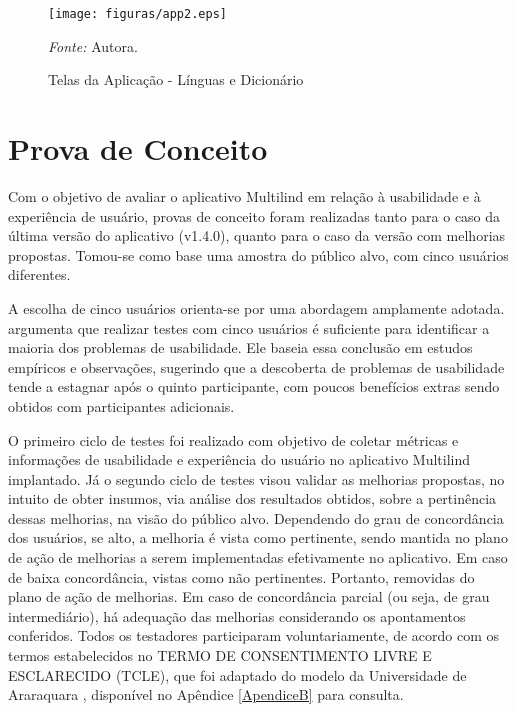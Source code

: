 \begin{figure}[h!]
	\centering
	\caption{Telas da Aplicação - Línguas e Dicionário}
	\begin{adjustbox}{center}
		\texttt{[image: figuras/app2.eps]}
	\end{adjustbox}
	\begin{tablenotes}[flushleft]
		\centering
		\item \textit{Fonte:} Autora.
	\end{tablenotes}
	\label{fig19}
\end{figure}


\section{Prova de Conceito}
\label{sec:Prova de Conceito}
Com o objetivo de avaliar o aplicativo Multilind em relação à usabilidade e à experiência de usuário, provas de conceito foram 
realizadas tanto para o caso da última versão do aplicativo (v1.4.0), quanto para o caso da versão com melhorias propostas. Tomou-se como base uma amostra do público alvo, com cinco 
usuários diferentes.

A escolha de cinco usuários orienta-se por uma abordagem amplamente adotada.  argumenta que realizar testes com cinco usuários é suficiente para identificar a maioria dos problemas de 
usabilidade. Ele baseia essa conclusão em estudos empíricos e observações, sugerindo que a descoberta de problemas de usabilidade tende a estagnar após o quinto participante, com poucos benefícios 
extras sendo obtidos com participantes adicionais.

O primeiro ciclo de testes foi realizado com objetivo de coletar métricas e informações de usabilidade e experiência do usuário no aplicativo Multilind implantado. Já o segundo ciclo de testes visou validar as 
melhorias propostas, no intuito de obter insumos, via análise dos resultados obtidos, sobre a pertinência dessas melhorias, na visão do público alvo. Dependendo do grau de concordância dos usuários, se alto, a 
melhoria é vista como pertinente, sendo mantida no plano de ação de melhorias a serem implementadas efetivamente no aplicativo. Em caso de baixa concordância, vistas como não pertinentes. Portanto, removidas 
do plano de ação de melhorias. Em caso de concordância parcial (ou seja, de grau intermediário), há adequação das melhorias considerando os apontamentos conferidos. Todos os testadores participaram voluntariamente, 
de acordo com os termos estabelecidos no  TERMO DE CONSENTIMENTO LIVRE E ESCLARECIDO (TCLE), que foi adaptado do modelo da Universidade de Araraquara \cite{tcle}, disponível no Apêndice \ref{ApendiceB} para consulta.
 
